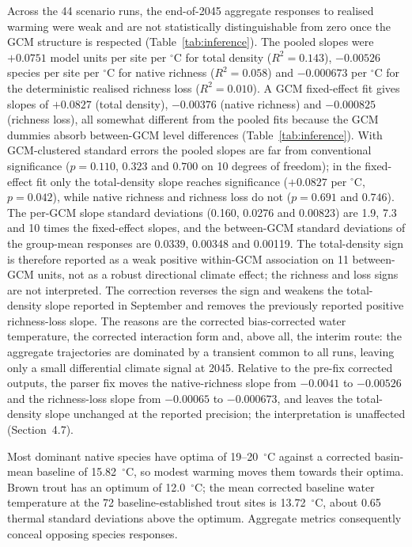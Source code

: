 \documentclass[11pt,a4paper]{article}
\begin{document}
Across the 44 scenario runs, the end-of-2045 aggregate responses to realised warming were weak and are not statistically distinguishable from zero once the GCM structure is respected (Table~\ref{tab:inference}). The pooled slopes were $+0.0751$ model units per site per $^\circ$C for total density ($R^2=0.143$), $-0.00526$ species per site per $^\circ$C for native richness ($R^2=0.058$) and $-0.000673$ per $^\circ$C for the deterministic realised richness loss ($R^2=0.010$). A GCM fixed-effect fit gives slopes of $+0.0827$ (total density), $-0.00376$ (native richness) and $-0.000825$ (richness loss), all somewhat different from the pooled fits because the GCM dummies absorb between-GCM level differences (Table~\ref{tab:inference}). With GCM-clustered standard errors the pooled slopes are far from conventional significance ($p=0.110$, $0.323$ and $0.700$ on 10 degrees of freedom); in the fixed-effect fit only the total-density slope reaches significance ($+0.0827$ per $^\circ$C, $p=0.042$), while native richness and richness loss do not ($p=0.691$ and $0.746$). The per-GCM slope standard deviations (0.160, 0.0276 and 0.00823) are 1.9, 7.3 and 10 times the fixed-effect slopes, and the between-GCM standard deviations of the group-mean responses are 0.0339, 0.00348 and 0.00119. The total-density sign is therefore reported as a weak positive within-GCM association on 11 between-GCM units, not as a robust directional climate effect; the richness and loss signs are not interpreted. The correction reverses the sign and weakens the total-density slope reported in September and removes the previously reported positive richness-loss slope. The reasons are the corrected bias-corrected water temperature, the corrected interaction form and, above all, the interim route: the aggregate trajectories are dominated by a transient common to all runs, leaving only a small differential climate signal at 2045. Relative to the pre-fix corrected outputs, the parser fix moves the native-richness slope from $-0.0041$ to $-0.00526$ and the richness-loss slope from $-0.00065$ to $-0.000673$, and leaves the total-density slope unchanged at the reported precision; the interpretation is unaffected (Section~4.7).

Most dominant native species have optima of 19--20~$^\circ$C against a corrected basin-mean baseline of 15.82~$^\circ$C, so modest warming moves them towards their optima. Brown trout has an optimum of 12.0~$^\circ$C; the mean corrected baseline water temperature at the 72 baseline-established trout sites is 13.72~$^\circ$C, about 0.65 thermal standard deviations above the optimum. Aggregate metrics consequently conceal opposing species responses.
\end{document}

